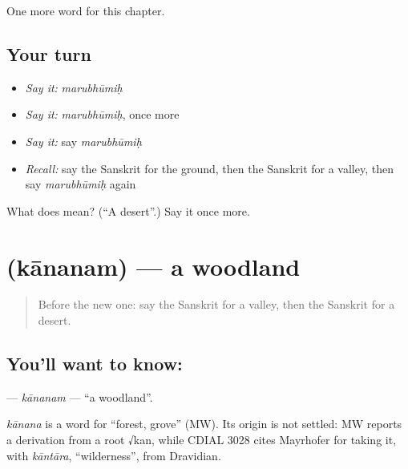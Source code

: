 \begin{grammarlens}[title={What you've built}]
One more word for this chapter.
\end{grammarlens}

\subsection*{Your turn}
\begin{itemize}
\raggedright
  \item \emph{Say it:} \emph{marubhūmiḥ}
  \item \emph{Say it:} \emph{marubhūmiḥ}, once more
  \item \emph{Say it:} say \emph{marubhūmiḥ}
  \item \emph{Recall:} say the Sanskrit for the ground, then the Sanskrit for a valley, then say \emph{marubhūmiḥ} again
\end{itemize}

\begin{tcolorbox}[breakable,colback=teal!4,colframe=teal!35!black,title={Before you move on}]
What does  mean? (\textquotedblleft{}A desert\textquotedblright{}.) Say it once more.
\end{tcolorbox}
\section[\texorpdfstring{\sk{काननम्} (kānanam)}{काननम् (kānanam)}]{ (kānanam) — a woodland}

\label{lesson:SA-C225-kananam}



\begin{quote}
Before the new one: say the Sanskrit for a valley, then the Sanskrit for a desert.
\end{quote}

\subsection*{You'll want to know: }
\textbf{} — \emph{kānanam} — \textquotedblleft{}a woodland\textquotedblright{}.

\begin{cousinweb}
\emph{kānana} is a word for \textquotedblleft{}forest, grove\textquotedblright{} (MW). Its origin is not settled: MW reports a derivation from a root √kan, while CDIAL 3028 cites Mayrhofer for taking it, with \emph{kāntāra}, \textquotedblleft{}wilderness\textquotedblright{}, from Dravidian.
\end{cousinweb}

